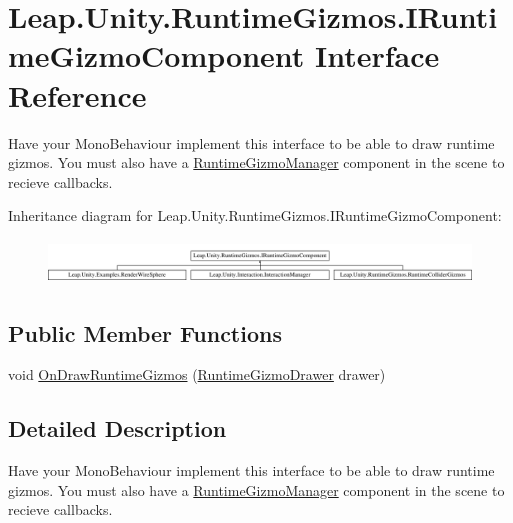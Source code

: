 \hypertarget{interface_leap_1_1_unity_1_1_runtime_gizmos_1_1_i_runtime_gizmo_component}{}\section{Leap.\+Unity.\+Runtime\+Gizmos.\+I\+Runtime\+Gizmo\+Component Interface Reference}
\label{interface_leap_1_1_unity_1_1_runtime_gizmos_1_1_i_runtime_gizmo_component}


Have your Mono\+Behaviour implement this interface to be able to draw runtime gizmos. You must also have a \mbox{\hyperlink{class_leap_1_1_unity_1_1_runtime_gizmos_1_1_runtime_gizmo_manager}{Runtime\+Gizmo\+Manager}} component in the scene to recieve callbacks.  


Inheritance diagram for Leap.\+Unity.\+Runtime\+Gizmos.\+I\+Runtime\+Gizmo\+Component\+:\begin{figure}[H]
\begin{center}
\leavevmode
\includegraphics[height=1.181435cm]{interface_leap_1_1_unity_1_1_runtime_gizmos_1_1_i_runtime_gizmo_component}
\end{center}
\end{figure}
\subsection*{Public Member Functions}
\begin{DoxyCompactItemize}
\item 
void \mbox{\hyperlink{interface_leap_1_1_unity_1_1_runtime_gizmos_1_1_i_runtime_gizmo_component_abaa7cf174480d957b48d0023df50291d}{On\+Draw\+Runtime\+Gizmos}} (\mbox{\hyperlink{class_leap_1_1_unity_1_1_runtime_gizmos_1_1_runtime_gizmo_drawer}{Runtime\+Gizmo\+Drawer}} drawer)
\end{DoxyCompactItemize}


\subsection{Detailed Description}
Have your Mono\+Behaviour implement this interface to be able to draw runtime gizmos. You must also have a \mbox{\hyperlink{class_leap_1_1_unity_1_1_runtime_gizmos_1_1_runtime_gizmo_manager}{Runtime\+Gizmo\+Manager}} component in the scene to recieve callbacks. 



